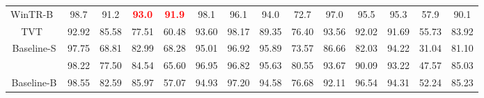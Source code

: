 \documentclass[journal]{IEEEtran}
\begin{document}
\begin{table*}[htp]
{\begin{tabular}{cccccccccccccc}
WinTR-B~\cite{ma2021exploitingWinTR}                             & 98.7                 & 91.2                                  & \textcolor{red}{\textbf{93.0}}                 & \textcolor{red}{\textbf{91.9}}                                  & 98.1                                  & 96.1                                  & 94.0                 & 72.7                                  & 97.0                                  & 95.5                                  & 95.3                                 & 57.9                                  & 90.1                                  \\
TVT~\cite{yang2021tvtTVT}                                 & 92.92                & 85.58                                 & 77.51                & 60.48                                 & 93.60                                 & 98.17                                 & 89.35                & 76.40                                 & 93.56                                 & 92.02                                 & 91.69                                & 55.73                                 & 83.92                                 \\ \hline \hline
Baseline-S                          & \multicolumn{1}{c}{97.75} & \multicolumn{1}{c}{68.81}                  & \multicolumn{1}{c}{82.99} & \multicolumn{1}{c}{68.28}                  & \multicolumn{1}{c}{95.01}                  & \multicolumn{1}{c}{96.92}                  & \multicolumn{1}{c}{95.89} & \multicolumn{1}{c}{73.57}                  & \multicolumn{1}{c}{86.66}                  & \multicolumn{1}{c}{82.03}                  & \multicolumn{1}{c}{94.22}                 & \multicolumn{1}{c}{31.04}                  & \multicolumn{1}{c}{81.10}                  \\
\rowcolor[gray]{0.9} \multicolumn{1}{c}{+Ours} & \multicolumn{1}{c}{98.22} & \multicolumn{1}{c}{77.50}                  & \multicolumn{1}{c}{84.54} & \multicolumn{1}{c}{65.60}                  & \multicolumn{1}{c}{96.95}                  & \multicolumn{1}{c}{96.82}                  & \multicolumn{1}{c}{95.63} & \multicolumn{1}{c}{80.55}                  & \multicolumn{1}{c}{93.67}                  & \multicolumn{1}{c}{90.09}                  & \multicolumn{1}{c}{93.22}                 & \multicolumn{1}{c}{47.57}                  & \multicolumn{1}{c}{85.03}                  \\ \hline


Baseline-B                          & \multicolumn{1}{c}{98.55} & \multicolumn{1}{c}{82.59}                  & \multicolumn{1}{c}{85.97} & \multicolumn{1}{c}{57.07}                  & \multicolumn{1}{c}{94.93}                  & \multicolumn{1}{c}{97.20}                  & \multicolumn{1}{l}{94.58} & \multicolumn{1}{c}{76.68}                  & \multicolumn{1}{c}{92.11}                  & \multicolumn{1}{c}{96.54}                  & \multicolumn{1}{c}{94.31}                 & \multicolumn{1}{c}{52.24}                  & \multicolumn{1}{c}{85.23}                  \\



\end{tabular}}
\end{table*}
\end{document}
